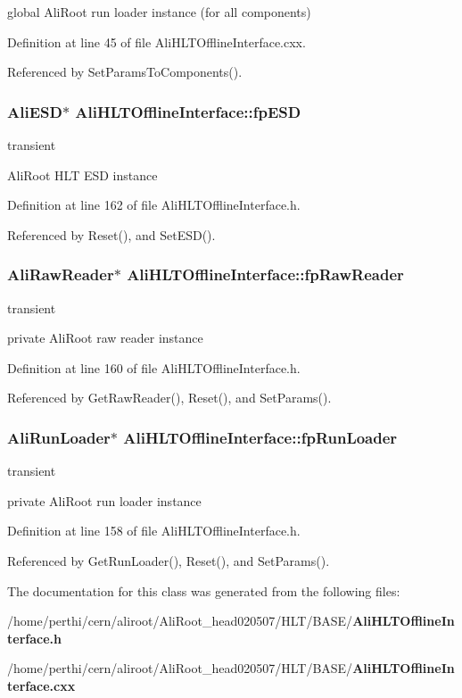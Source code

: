 global Ali\-Root run loader instance (for all components) 

Definition at line 45 of file Ali\-HLTOffline\-Interface.cxx.

Referenced by Set\-Params\-To\-Components().
\subsubsection{\setlength{\rightskip}{0pt plus 5cm}Ali\-ESD$\ast$ {\bf Ali\-HLTOffline\-Interface::fp\-ESD}\hspace{0.3cm}{\tt  [private]}}\label{classAliHLTOfflineInterface_r2}


transient 

Ali\-Root HLT ESD instance 

Definition at line 162 of file Ali\-HLTOffline\-Interface.h.

Referenced by Reset(), and Set\-ESD().
\subsubsection{\setlength{\rightskip}{0pt plus 5cm}Ali\-Raw\-Reader$\ast$ {\bf Ali\-HLTOffline\-Interface::fp\-Raw\-Reader}\hspace{0.3cm}{\tt  [private]}}\label{classAliHLTOfflineInterface_r1}


transient 

private Ali\-Root raw reader instance 

Definition at line 160 of file Ali\-HLTOffline\-Interface.h.

Referenced by Get\-Raw\-Reader(), Reset(), and Set\-Params().
\subsubsection{\setlength{\rightskip}{0pt plus 5cm}Ali\-Run\-Loader$\ast$ {\bf Ali\-HLTOffline\-Interface::fp\-Run\-Loader}\hspace{0.3cm}{\tt  [private]}}\label{classAliHLTOfflineInterface_r0}


transient 

private Ali\-Root run loader instance 

Definition at line 158 of file Ali\-HLTOffline\-Interface.h.

Referenced by Get\-Run\-Loader(), Reset(), and Set\-Params().

The documentation for this class was generated from the following files:\begin{CompactItemize}
\item 
/home/perthi/cern/aliroot/Ali\-Root\_\-head020507/HLT/BASE/{\bf Ali\-HLTOffline\-Interface.h}\item 
/home/perthi/cern/aliroot/Ali\-Root\_\-head020507/HLT/BASE/{\bf Ali\-HLTOffline\-Interface.cxx}\end{CompactItemize}
